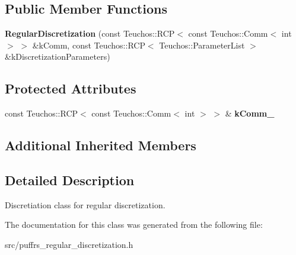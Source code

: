 \subsection*{Public Member Functions}
\begin{DoxyCompactItemize}
\item 
\mbox{\label{classpuffrs_1_1RegularDiscretization_adb66672889168f2829fd7d8b1cc5faee}} 
{\bfseries Regular\+Discretization} (const Teuchos\+::\+R\+CP$<$ const Teuchos\+::\+Comm$<$ int $>$ $>$ \&k\+Comm, const Teuchos\+::\+R\+CP$<$ Teuchos\+::\+Parameter\+List $>$ \&k\+Discretization\+Parameters)
\end{DoxyCompactItemize}
\subsection*{Protected Attributes}
\begin{DoxyCompactItemize}
\item 
\mbox{\label{classpuffrs_1_1RegularDiscretization_a5306dd2eda5b9c75850e889e6b0a2b54}} 
const Teuchos\+::\+R\+CP$<$ const Teuchos\+::\+Comm$<$ int $>$ $>$ \& {\bfseries k\+Comm\+\_\+}
\end{DoxyCompactItemize}
\subsection*{Additional Inherited Members}


\subsection{Detailed Description}
Discretiation class for regular discretization. 

The documentation for this class was generated from the following file\+:\begin{DoxyCompactItemize}
\item 
src/puffrs\+\_\+regular\+\_\+discretization.\+h\end{DoxyCompactItemize}
